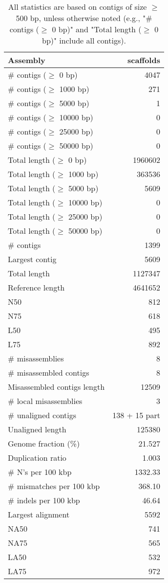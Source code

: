 \documentclass[12pt,a4paper]{article}
\begin{document}
\begin{table}[ht]
\begin{center}
\caption{All statistics are based on contigs of size $\geq$ 500 bp, unless otherwise noted (e.g., "\# contigs ($\geq$ 0 bp)" and "Total length ($\geq$ 0 bp)" include all contigs).}
\begin{tabular}{|l*{1}{|r}|}
\hline
Assembly & scaffolds \\ \hline
\# contigs ($\geq$ 0 bp) & 4047 \\ \hline
\# contigs ($\geq$ 1000 bp) & 271 \\ \hline
\# contigs ($\geq$ 5000 bp) & 1 \\ \hline
\# contigs ($\geq$ 10000 bp) & 0 \\ \hline
\# contigs ($\geq$ 25000 bp) & 0 \\ \hline
\# contigs ($\geq$ 50000 bp) & 0 \\ \hline
Total length ($\geq$ 0 bp) & 1960602 \\ \hline
Total length ($\geq$ 1000 bp) & 363536 \\ \hline
Total length ($\geq$ 5000 bp) & 5609 \\ \hline
Total length ($\geq$ 10000 bp) & 0 \\ \hline
Total length ($\geq$ 25000 bp) & 0 \\ \hline
Total length ($\geq$ 50000 bp) & 0 \\ \hline
\# contigs & 1399 \\ \hline
Largest contig & 5609 \\ \hline
Total length & 1127347 \\ \hline
Reference length & 4641652 \\ \hline
N50 & 812 \\ \hline
N75 & 618 \\ \hline
L50 & 495 \\ \hline
L75 & 892 \\ \hline
\# misassemblies & 8 \\ \hline
\# misassembled contigs & 8 \\ \hline
Misassembled contigs length & 12509 \\ \hline
\# local misassemblies & 3 \\ \hline
\# unaligned contigs & 138 + 15 part \\ \hline
Unaligned length & 125380 \\ \hline
Genome fraction (\%) & 21.527 \\ \hline
Duplication ratio & 1.003 \\ \hline
\# N's per 100 kbp & 1332.33 \\ \hline
\# mismatches per 100 kbp & 368.10 \\ \hline
\# indels per 100 kbp & 46.64 \\ \hline
Largest alignment & 5592 \\ \hline
NA50 & 741 \\ \hline
NA75 & 565 \\ \hline
LA50 & 532 \\ \hline
LA75 & 972 \\ \hline
\end{tabular}
\end{center}
\end{table}
\end{document}

